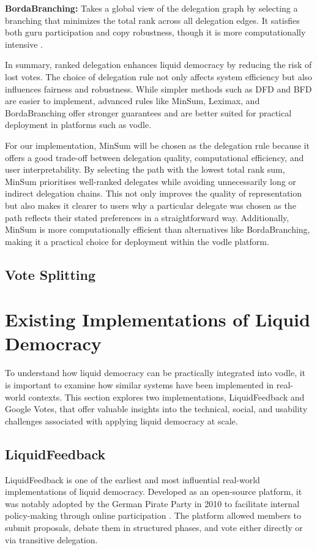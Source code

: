 \textbf{BordaBranching:} Takes a global view of the delegation graph by selecting a branching that minimizes the total rank across all delegation edges. It satisfies both guru participation and copy robustness, though it is more computationally intensive \citep{brill_liquid_2022}.

In summary, ranked delegation enhances liquid democracy by reducing the risk of lost votes. The choice of delegation rule not only affects system efficiency but also influences fairness and robustness. While simpler methods such as DFD and BFD are easier to implement, advanced rules like MinSum, Leximax, and BordaBranching offer stronger guarantees and are better suited for practical deployment in platforms such as vodle.

For our implementation, MinSum will be chosen as the delegation rule because it offers a good trade-off between delegation quality, computational efficiency, and user interpretability. By selecting the path with the lowest total rank sum, MinSum prioritises well-ranked delegates while avoiding unnecessarily long or indirect delegation chains. This not only improves the quality of representation but also makes it clearer to users why a particular delegate was chosen as the path reflects their stated preferences in a straightforward way. Additionally, MinSum is more computationally efficient than alternatives like BordaBranching, making it a practical choice for deployment within the vodle platform.

\subsection*{Vote Splitting}
\label{sub-section:vote-splitting}



\section{Existing Implementations of Liquid Democracy}
To understand how liquid democracy can be practically integrated into vodle, it is important to examine how similar systems have been implemented in real-world contexts. 
This section explores two implementations, LiquidFeedback and Google Votes, that offer valuable insights into the technical, social, and usability challenges associated with applying liquid democracy at scale.
\subsection{LiquidFeedback}
LiquidFeedback is one of the earliest and most influential real-world implementations of liquid democracy. Developed as an open-source platform, it was notably adopted by the German Pirate Party in 2010 to facilitate internal policy-making through online participation \citep{behrens_liquidfeedback_2014}. The platform allowed members to submit proposals, debate them in structured phases, and vote either directly or via transitive delegation.

